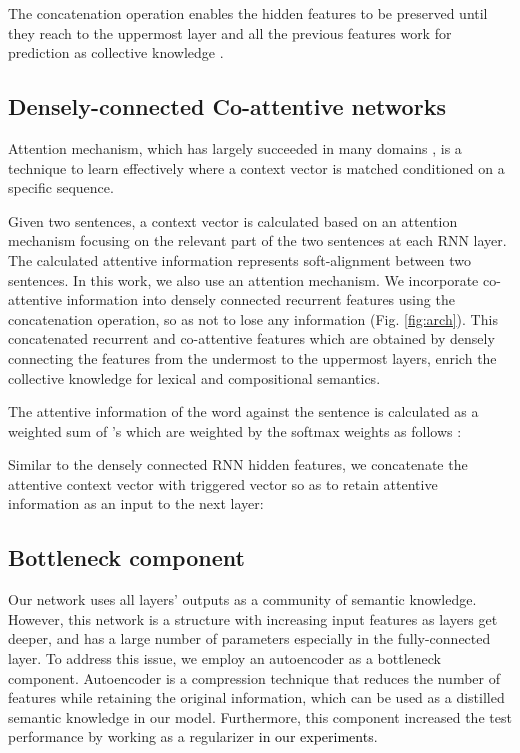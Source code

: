 \documentclass[letterpaper]{article} \usepackage{aaai19}  \usepackage{times}  \usepackage{helvet}  \usepackage{courier}  \usepackage{url}  \usepackage{graphicx}  \frenchspacing  \setlength{\pdfpagewidth}{8.5in}  \setlength{\pdfpageheight}{11in}
\newcommand\sh[1]{\textcolor{black}{#1}}
\begin{document}
The concatenation operation enables the hidden features to be preserved until they reach to the uppermost layer and all the previous features work for prediction as collective knowledge \cite{huang2017densely}.


\subsection{Densely-connected Co-attentive networks}

Attention mechanism, which has largely succeeded in many domains \cite{wu2016gnmt,vaswani2017attention}, is a technique to learn effectively where a context vector is matched conditioned on a specific sequence.

Given two sentences, a context vector is calculated based on an attention mechanism focusing on the relevant part of the two sentences at each RNN layer. The calculated attentive information represents soft-alignment between two sentences. In this work, we also use an attention mechanism. 
We incorporate co-attentive information into densely connected recurrent features using the concatenation operation, so as not to lose any information (Fig. \ref{fig:arch}). This concatenated recurrent and co-attentive features which are obtained by  densely connecting the features from the undermost to the uppermost layers, enrich the collective knowledge for lexical and compositional semantics.



The attentive information  of the  word  against the sentence  is calculated as a weighted sum of 's which are weighted by the softmax weights as follows :


Similar to the densely connected RNN hidden features, we concatenate the attentive context vector  with triggered vector  so as to retain attentive information as an input to the next layer: 



\subsection{Bottleneck component}
Our network uses all layers' outputs as a community of semantic knowledge. However, this network is a structure with increasing input features as layers get deeper, and has a large number of parameters especially in the fully-connected layer. To address this issue, we employ an autoencoder as a bottleneck component. Autoencoder is a compression technique that reduces the number of features while retaining the original information, which can be used as a distilled semantic knowledge in our model. Furthermore, this component increased the test performance by working as a regularizer \sh{in our experiments}.
\end{document}
